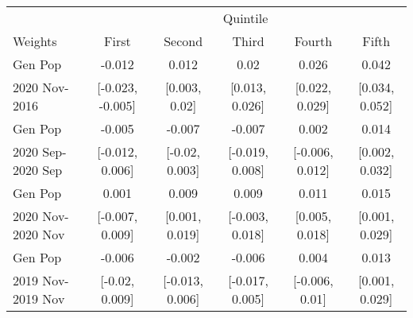 \begin{tabular}{l|ccccc}
\hline\hline
      & \multicolumn{5}{c}{Quintile} \\
Weights & First & Second & Third & Fourth & Fifth \\
\hline\hline
Gen Pop  &  -0.012 & 0.012 & 0.02 & 0.026 & 0.042 \\ 
 2020 Nov-2016 & [-0.023, -0.005] & [0.003, 0.02] & [0.013, 0.026] & [0.022, 0.029] & [0.034, 0.052] \\ 
 \hline
Gen Pop  &  -0.005 & -0.007 & -0.007 & 0.002 & 0.014 \\ 
 2020 Sep-2020 Sep & [-0.012, 0.006] & [-0.02, 0.003] & [-0.019, 0.008] & [-0.006, 0.012] & [0.002, 0.032] \\ 
 \hline
Gen Pop  &  0.001 & 0.009 & 0.009 & 0.011 & 0.015 \\ 
 2020 Nov-2020 Nov & [-0.007, 0.009] & [0.001, 0.019] & [-0.003, 0.018] & [0.005, 0.018] & [0.001, 0.029] \\ 
 \hline
Gen Pop  &  -0.006 & -0.002 & -0.006 & 0.004 & 0.013 \\ 
 2019 Nov-2019 Nov & [-0.02, 0.009] & [-0.013, 0.006] & [-0.017, 0.005] & [-0.006, 0.01] & [0.001, 0.029] \\ 
 \hline
\hline
\end{tabular}
